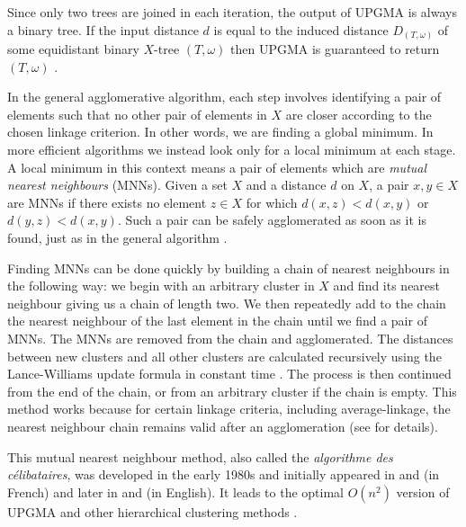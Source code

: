 Since only two trees are joined in each iteration, the output of UPGMA is
always a binary tree.  If the input distance $d$ is equal to the induced
distance $D_{(T,\omega)}$ of some equidistant binary $X$-tree $(T,\omega)$
then UPGMA is guaranteed to return $(T,\omega)$ \cite{durbin1998biological}.



In the general agglomerative algorithm, each step involves identifying a pair
of elements such that no other pair of elements in $X$ are closer according to
the chosen linkage criterion.  In other words, we are finding a global
minimum.  In more efficient algorithms we instead look only for a local
minimum at each stage.  A local minimum in this context means a pair of
elements which are \textit{mutual nearest neighbours} (MNNs).  Given a set $X$
and a distance $d$ on $X$, a pair $x,y \in X$ are MNNs if there exists no
element $z \in X$ for which $d(x,z) < d(x,y)$ or $d(y,z) < d(x,y)$.  Such a
pair can be safely agglomerated as soon as it is found, just as in the general
algorithm \cite{murtagh2011methods}.

Finding MNNs can be done quickly by building a chain of nearest neighbours in
the following way: we begin with an arbitrary cluster in $X$ and find its
nearest neighbour giving us a chain of length two.  We then repeatedly add to
the chain the nearest neighbour of the last element in the chain until we find
a pair of MNNs.  The MNNs are removed from the chain and agglomerated.  The
distances between new clusters and all other clusters are calculated
recursively using the Lance-Williams update formula in constant time
\cite{lance66theory}.  The process is then continued from the end of the
chain, or from an arbitrary cluster if the chain is empty.  This method works
because for certain linkage criteria, including average-linkage, the nearest
neighbour chain remains valid after an agglomeration (see
\cite{gronau2007optimal} for details).

This mutual nearest neighbour method, also called the \textit{algorithme des
  célibataires}, was developed in the early 1980s and initially appeared in
\cite{de1980classification} and \cite{juan1982programme} (in French) and later
in \cite{murtagh1983survey} and \cite{murtagh1984complexities} (in English).
It leads to the optimal $O(n^2)$ version of UPGMA and other hierarchical
clustering methods \cite{gronau2007optimal}.

